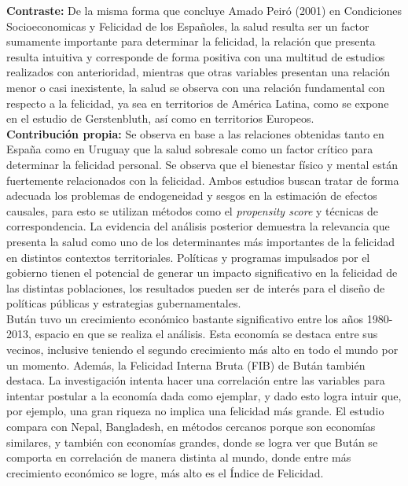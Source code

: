 \textbf{Contraste:} De la misma forma que concluye Amado Peiró (2001) en Condiciones Socioeconomicas y Felicidad de los Españoles, la salud resulta ser un factor sumamente importante para determinar la felicidad, la relación que presenta resulta intuitiva y corresponde de forma positiva con una multitud de estudios realizados con anterioridad, mientras que otras variables presentan una relación menor o casi inexistente, la salud se observa con una relación fundamental con respecto a la felicidad, ya sea en territorios de América Latina, como se expone en el estudio de Gerstenbluth, así como en territorios Europeos.\\

\textbf{Contribución propia: }Se observa en base a las relaciones obtenidas tanto en España como en Uruguay que la salud sobresale como un factor crítico para determinar la felicidad personal. Se observa que el bienestar físico y mental están fuertemente relacionados con la felicidad. Ambos estudios buscan tratar de forma adecuada los problemas de endogeneidad y sesgos en la estimación de efectos causales, para esto se utilizan métodos como el \textit{propensity score} y técnicas de correspondencia. La evidencia del análisis posterior demuestra la relevancia que presenta la salud como uno de los determinantes más importantes de la felicidad en distintos contextos territoriales. Políticas y programas impulsados por el gobierno tienen el potencial de generar un impacto significativo en la felicidad de las distintas poblaciones, los resultados pueden ser de interés para el diseño de políticas públicas y estrategias gubernamentales.\\

Bután tuvo un crecimiento económico bastante significativo entre los años 1980-2013, espacio en que se realiza el análisis. Esta economía se destaca entre sus vecinos, inclusive teniendo el segundo crecimiento más alto en todo el mundo por un momento. Además, la Felicidad Interna Bruta (FIB) de Bután también destaca. La investigación intenta hacer una correlación entre las variables para intentar postular a la economía dada como ejemplar, y dado esto logra intuir que, por ejemplo, una gran riqueza no implica una felicidad más grande. El estudio compara con Nepal, Bangladesh, en métodos cercanos porque son economías similares, y también con economías grandes, donde se logra ver que Bután se comporta en correlación de manera distinta al mundo, donde entre más crecimiento económico se logre, más alto es el Índice de Felicidad.\\

